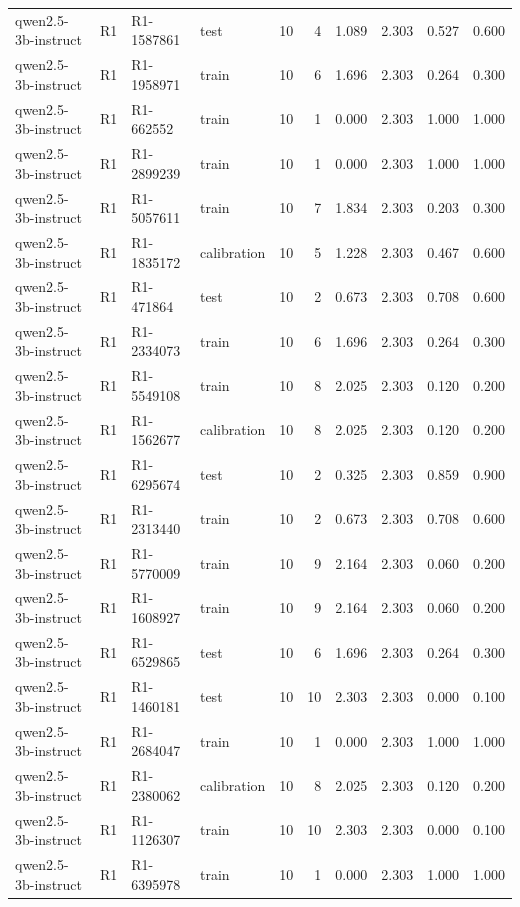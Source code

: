 \begin{table}
\begin{tabular}{llllrrrrrr}
qwen2.5-3b-instruct & R1 & R1-1587861 & test & 10 & 4 & 1.089 & 2.303 & 0.527 & 0.600 \\
qwen2.5-3b-instruct & R1 & R1-1958971 & train & 10 & 6 & 1.696 & 2.303 & 0.264 & 0.300 \\
qwen2.5-3b-instruct & R1 & R1-662552 & train & 10 & 1 & 0.000 & 2.303 & 1.000 & 1.000 \\
qwen2.5-3b-instruct & R1 & R1-2899239 & train & 10 & 1 & 0.000 & 2.303 & 1.000 & 1.000 \\
qwen2.5-3b-instruct & R1 & R1-5057611 & train & 10 & 7 & 1.834 & 2.303 & 0.203 & 0.300 \\
qwen2.5-3b-instruct & R1 & R1-1835172 & calibration & 10 & 5 & 1.228 & 2.303 & 0.467 & 0.600 \\
qwen2.5-3b-instruct & R1 & R1-471864 & test & 10 & 2 & 0.673 & 2.303 & 0.708 & 0.600 \\
qwen2.5-3b-instruct & R1 & R1-2334073 & train & 10 & 6 & 1.696 & 2.303 & 0.264 & 0.300 \\
qwen2.5-3b-instruct & R1 & R1-5549108 & train & 10 & 8 & 2.025 & 2.303 & 0.120 & 0.200 \\
qwen2.5-3b-instruct & R1 & R1-1562677 & calibration & 10 & 8 & 2.025 & 2.303 & 0.120 & 0.200 \\
qwen2.5-3b-instruct & R1 & R1-6295674 & test & 10 & 2 & 0.325 & 2.303 & 0.859 & 0.900 \\
qwen2.5-3b-instruct & R1 & R1-2313440 & train & 10 & 2 & 0.673 & 2.303 & 0.708 & 0.600 \\
qwen2.5-3b-instruct & R1 & R1-5770009 & train & 10 & 9 & 2.164 & 2.303 & 0.060 & 0.200 \\
qwen2.5-3b-instruct & R1 & R1-1608927 & train & 10 & 9 & 2.164 & 2.303 & 0.060 & 0.200 \\
qwen2.5-3b-instruct & R1 & R1-6529865 & test & 10 & 6 & 1.696 & 2.303 & 0.264 & 0.300 \\
qwen2.5-3b-instruct & R1 & R1-1460181 & test & 10 & 10 & 2.303 & 2.303 & 0.000 & 0.100 \\
qwen2.5-3b-instruct & R1 & R1-2684047 & train & 10 & 1 & 0.000 & 2.303 & 1.000 & 1.000 \\
qwen2.5-3b-instruct & R1 & R1-2380062 & calibration & 10 & 8 & 2.025 & 2.303 & 0.120 & 0.200 \\
qwen2.5-3b-instruct & R1 & R1-1126307 & train & 10 & 10 & 2.303 & 2.303 & 0.000 & 0.100 \\
qwen2.5-3b-instruct & R1 & R1-6395978 & train & 10 & 1 & 0.000 & 2.303 & 1.000 & 1.000 \\

\end{tabular}
\end{table}
